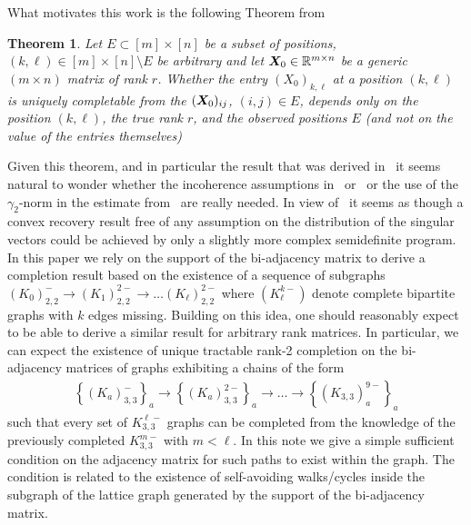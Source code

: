 \documentclass[12pt]{article}
\newtheorem{theorem}{Theorem}
\def\bs{\ensuremath\boldsymbol}
\begin{document}
What motivates this work is the following Theorem from~\cite{kiraly2015algebraic}
\begin{theorem}\label{theoremOnlystructure01}
Let $E\subset [m]\times [n]$ be a subset of positions, $(k, \ell)\in [m]\times [n]\setminus E$ be arbitrary and let $\bs X_0\in \mathbb{R}^{m\times n}$ be a generic $(m\times n)$ matrix of rank $r$. Whether the entry $(X_0)_{k, \ell}$ at a position $(k, \ell)$ is uniquely completable from the $(\bs X_0)_{ij}$, $(i,j)\in E$, depends only on the position $(k, \ell)$, the true rank $r$, and the observed positions $E$ (and not on the value of the entries themselves)
\end{theorem}
Given this theorem,  and in particular the result that was derived in~\cite{cosse2021stable} it seems natural to wonder whether the incoherence assumptions in~\cite{bhojanapalli2014universal} or~\cite{candes2010power} or the use of the $\gamma_2$-norm in the estimate from~\cite{heiman2014deterministic} are really needed.  In view of~\cite{cosse2021stable} it seems as though a convex recovery result free of any assumption on the distribution of the singular vectors could be achieved by only a slightly more complex semidefinite program.  In this paper we rely on the support of the bi-adjacency matrix to derive a completion result based on the existence of a sequence of subgraphs $\left(K_0\right)_{2,2}^- \rightarrow \left(K_1\right)_{2,2}^{2-} \rightarrow \ldots \left(K_\ell\right)_{2,2}^{2-}$ where $(K_{\ell}^{k-})$ denote complete bipartite graphs with $k$ edges missing.  Building on this idea, one should reasonably expect to be able to derive a similar result for arbitrary rank matrices. In particular, we can expect the existence of unique tractable rank-2 completion on the bi-adjacency matrices of graphs exhibiting a chains of the form 
\begin{align}
\left\{(K_a)_{3,3}^{-}\right\}_a\rightarrow \left\{(K_a)_{3,3}^{2-}\right\}_a \rightarrow \ldots \rightarrow \left\{(K_{3,3})_a^{9-}\right\}_a\label{bipartitePath}\end{align}
such that every set of $K_{3,3}^{\ell-}$ graphs can be completed from the knowledge of the previously completed $K_{3,3}^{m-}$ with $m<\ell$. In this note we give a simple sufficient condition on the adjacency matrix for such paths to exist within the graph. The condition is related to the existence of self-avoiding walks/cycles inside the subgraph of the lattice graph generated by the support of the bi-adjacency matrix. 
\end{document}
